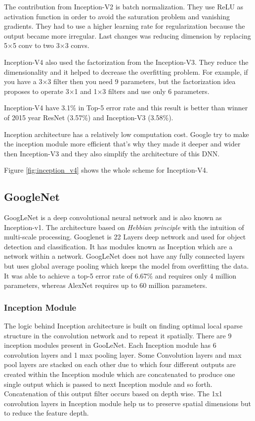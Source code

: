 \documentclass[titlepage]{report}
\begin{document}
The contribution from Inception-V2 is batch normalization. They use ReLU as activation function in order to avoid the saturation problem and vanishing gradients. They had to use a higher learning rate for regularization because the output became more irregular. Last changes was reducing dimension by replacing   5×5 conv to two 3×3 convs. 

Inception-V4 also used the factorization from the Inception-V3. They reduce the dimensionality and it helped to decrease the overfitting problem. For example, if you have a 3×3 filter then you need 9 parameters, but the factorization idea proposes to operate  3×1 and  1×3 filters and use only 6 parameters. 

Inception-V4 have 3.1\% in Top-5 error rate and this result is better than winner of 2015 year ResNet (3.57\%) and  Inception-V3 (3.58\%). 

Inception architecture has a relatively low computation cost. Google try to make the inception module more efficient that's why they made it deeper and wider then Inception-V3 and they also simplify the architecture of this DNN.

Figure \ref{fig:inception_v4} shows the whole scheme for Inception-V4.

\subsection{GoogleNet}
GoogLeNet is a deep convolutional neural network and is also known as Inception-v1. The architecture based on \textit{Hebbian principle} with the intuition of multi-scale processing. Googlenet is 22 Layers deep network and used for object detection and classification. It has modules known as Inception which are a network within a network. GoogLeNet does not have any fully connected layers but uses global average pooling which keeps the model from overfitting the data.
It was able to achieve a top-5 error rate of 6.67\% and requires only 4 million parameters, whereas AlexNet requires up to 60 million parameters.

\subsubsection{Inception Module}
The logic behind Inception architecture is built on finding optimal local sparse structure in the convolution network and to repeat it spatially. There are 9 inception modules present in GooLeNet. Each Inception module has 6 convolution layers and 1 max pooling layer. Some Convolution layers and max pool layers are stacked on each other due to which four different outputs are created within the Inception module which are concatenated to produce one single output which is passed to next Inception module and so forth. Concatenation of this output filter occurs based on depth wise. The 1x1 convolution layers in Inception module help us to preserve spatial dimensions but to reduce the feature depth.
\end{document}
